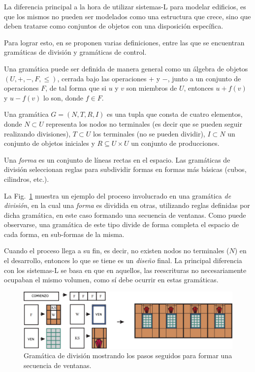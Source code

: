 La diferencia principal a la hora de utilizar sistemas-L para modelar edificios, es que los mismos no pueden ser modelados como una estructura que crece, sino que deben tratarse como conjuntos de objetos con una disposición específica.

Para lograr esto, en \cite{Wonka2003} se proponen varias definiciones, entre las que se encuentran gramáticas de división y gramáticas de control.



Una gramática puede ser definida de manera general como un álgebra de objetos $(U,+,-,F,\leq)$, cerrada bajo las operaciones $+$ y $-$, junto a un conjunto de operaciones $F$, de tal forma que si $u$ y $v$ son miembros de $U$, entonces $u+f(v)$ y $u-f(v)$ lo son, donde $f \in F$.

Una gramática $G=(N,T,R,I)$ es una tupla que consta de cuatro elementos, donde $N \subset U$ representa los nodos no terminales (es decir que se pueden seguir realizando divisiones), $T \subset U$ los terminales (no se pueden dividir), $I \subset N$ un conjunto de objetos iniciales y $R \subseteq U \times U$ un conjunto de producciones.



Una {\em forma} es un conjunto de líneas rectas en el espacio.
Las gramáticas de división seleccionan reglas para subdividir formas en formas más básicas (cubos, cilindros, etc.).

La Fig.~\ref{fg:splitgrammar} muestra un ejemplo del proceso involucrado en una gramática {\em de división}, en la cual una {\em forma} es dividida en otras, utilizando reglas definidas por dicha gramática, en este caso formando una secuencia de ventanas.
Como puede observarse, una gramática de este tipo divide de forma completa el espacio de cada forma, en sub-formas de la misma.

Cuando el proceso llega a su fin, es decir, no existen nodos no terminales ($N$) en el desarrollo, entonces lo que se tiene es un {\em diseño} final.
La principal diferencia con los sistemas-L se basa en que en aquellos, las reescrituras no necesariamente ocupaban el mismo volumen, como sí debe ocurrir en estas gramáticas.

\begin{figure}
\center
\includegraphics[width=13cm]{figures/splitgrammar}
\caption[Gramática para formar una secuencia de ventanas]{Gramática de división mostrando los pasos seguidos para formar una secuencia de ventanas.}
\label{fg:splitgrammar}
\end{figure}


